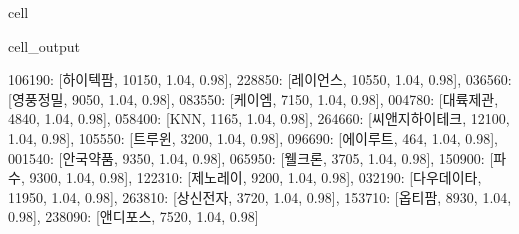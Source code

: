 \documentclass[letterpaper,10pt,english]{jupyterBook}
\begin{document}
\begin{sphinxuseclass}{cell}
\begin{sphinxVerbatimOutput}
\begin{sphinxuseclass}{cell_output}
\begin{sphinxVerbatim}[commandchars=\\\{\}]
 \PYGZsq{}106190\PYGZsq{}: [\PYGZsq{}하이텍팜\PYGZsq{}, 10150, 1.04, 0.98],
 \PYGZsq{}228850\PYGZsq{}: [\PYGZsq{}레이언스\PYGZsq{}, 10550, 1.04, 0.98],
 \PYGZsq{}036560\PYGZsq{}: [\PYGZsq{}영풍정밀\PYGZsq{}, 9050, 1.04, 0.98],
 \PYGZsq{}083550\PYGZsq{}: [\PYGZsq{}케이엠\PYGZsq{}, 7150, 1.04, 0.98],
 \PYGZsq{}004780\PYGZsq{}: [\PYGZsq{}대륙제관\PYGZsq{}, 4840, 1.04, 0.98],
 \PYGZsq{}058400\PYGZsq{}: [\PYGZsq{}KNN\PYGZsq{}, 1165, 1.04, 0.98],
 \PYGZsq{}264660\PYGZsq{}: [\PYGZsq{}씨앤지하이테크\PYGZsq{}, 12100, 1.04, 0.98],
 \PYGZsq{}105550\PYGZsq{}: [\PYGZsq{}트루윈\PYGZsq{}, 3200, 1.04, 0.98],
 \PYGZsq{}096690\PYGZsq{}: [\PYGZsq{}에이루트\PYGZsq{}, 464, 1.04, 0.98],
 \PYGZsq{}001540\PYGZsq{}: [\PYGZsq{}안국약품\PYGZsq{}, 9350, 1.04, 0.98],
 \PYGZsq{}065950\PYGZsq{}: [\PYGZsq{}웰크론\PYGZsq{}, 3705, 1.04, 0.98],
 \PYGZsq{}150900\PYGZsq{}: [\PYGZsq{}파수\PYGZsq{}, 9300, 1.04, 0.98],
 \PYGZsq{}122310\PYGZsq{}: [\PYGZsq{}제노레이\PYGZsq{}, 9200, 1.04, 0.98],
 \PYGZsq{}032190\PYGZsq{}: [\PYGZsq{}다우데이타\PYGZsq{}, 11950, 1.04, 0.98],
 \PYGZsq{}263810\PYGZsq{}: [\PYGZsq{}상신전자\PYGZsq{}, 3720, 1.04, 0.98],
 \PYGZsq{}153710\PYGZsq{}: [\PYGZsq{}옵티팜\PYGZsq{}, 8930, 1.04, 0.98],
 \PYGZsq{}238090\PYGZsq{}: [\PYGZsq{}앤디포스\PYGZsq{}, 7520, 1.04, 0.98]\PYGZcb{}
\end{sphinxVerbatim}

\end{sphinxuseclass}\end{sphinxVerbatimOutput}

\end{sphinxuseclass}
\end{document}
